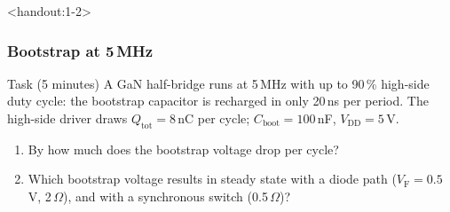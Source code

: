 \begin{frame}<handout:1-2>
	\frametitle{Bootstrap at 5\,MHz}
	\begin{block}{Task (5 minutes)}
		A GaN half-bridge runs at 5\,MHz with up to 90\,\% high-side duty cycle: the bootstrap capacitor is recharged in only 20\,ns per period. The high-side driver draws $Q_\mathrm{tot}=8$\,nC per cycle; $C_\mathrm{boot}=100$\,nF, $V_\mathrm{DD}=5$\,V.
		\begin{enumerate}
			\item By how much does the bootstrap voltage drop per cycle?
			\item Which bootstrap voltage results in steady state with a diode path ($V_\mathrm{F}=0.5$\,V, 2\,$\Omega$), and with a synchronous switch (0.5\,$\Omega$)?
		\end{enumerate}
	\end{block}
\end{frame}

